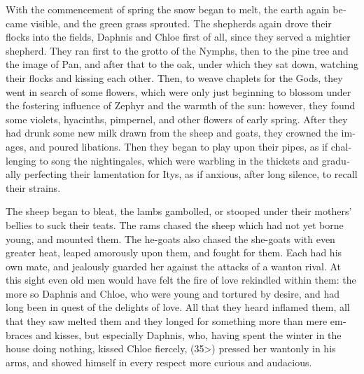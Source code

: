 \documentclass{book}
\begin{document}
\begin{pairs}
\begin{Rightside}
\begin{english}
  With the commencement of spring the snow began to melt, the earth again became visible, and the green grass sprouted.  The shepherds again drove their flocks into the fields, Daphnis and Chloe first of all, since they served a mightier shepherd.  They ran first to the grotto of the Nymphs, then to the pine tree and the image of Pan, and after that to the oak, under which they sat down, watching their flocks and kissing each other.  Then, to weave chaplets for the Gods, they went in search of some flowers, which were only just beginning to blossom under the fostering influence of Zephyr and the warmth of the sun: however, they found some violets, hyacinths, pimpernel, and other flowers of early spring.  After they had drunk some new milk drawn from the sheep and goats, they crowned the images, and poured libations.  Then they began to play upon their pipes, as if challenging to song the nightingales, which were warbling in the thickets and gradually perfecting their lamentation for Itys, as if anxious, after long silence, to recall their strains.
\pend


  The sheep began to bleat, the lambs gambolled, or stooped under their mothers' bellies to suck their teats.  The rams chased the sheep which had not yet borne young, and mounted them.  The he-goats also chased the she-goats with even greater heat, leaped amorously upon them, and fought for them.  Each had his own mate, and jealously guarded her against the attacks of a wanton rival.  At this sight even old men would have felt the fire of love rekindled within them: the more so Daphnis and Chloe, who were young and tortured by desire, and had long been in quest of the delights of love.  All that they heard inflamed them, all that they saw melted them and they longed for something more than mere embraces and kisses, but especially Daphnis, who, having spent the winter in the house doing nothing, kissed Chloe fiercely, (35>) pressed her wantonly in his arms, and showed himself in every respect more curious and audacious.
\pend



\end{english}
\end{Rightside}
\end{pairs}
\end{document}
